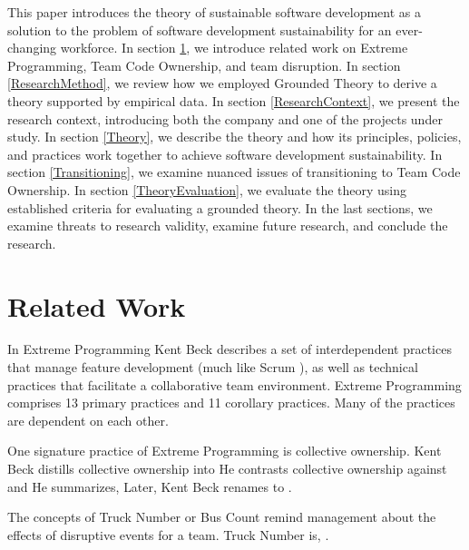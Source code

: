 This paper introduces the theory of sustainable software development as a solution to the problem of software development sustainability for an ever-changing workforce. In section \ref{RelatedWork}, we introduce related work on Extreme Programming, Team Code Ownership, and team disruption. In section \ref{ResearchMethod}, we review how we employed Grounded Theory to derive a theory supported by empirical data. In section \ref{ResearchContext}, we present the research context, introducing both the company and one of the projects under study. In section \ref{Theory}, we describe the theory and how its principles, policies, and practices work together to achieve software development sustainability. In section \ref{Transitioning}, we examine nuanced issues of transitioning to Team Code Ownership. In section \ref{TheoryEvaluation}, we evaluate the theory using established criteria for evaluating a grounded theory. In the last sections, we examine threats to research validity, examine future research, and conclude the research.
\section{Related Work}
\label{RelatedWork}
In Extreme Programming \cite{BeckExtremeProgramming2004} Kent Beck describes a set of interdependent practices that manage feature development (much like Scrum \cite{Scrum}), as well as technical practices that facilitate a collaborative team environment.  Extreme Programming comprises 13 primary practices and 11 corollary practices. Many of the practices are dependent on each other.  

One signature practice of Extreme Programming is collective ownership. Kent Beck distills collective ownership into  He contrasts collective ownership against  and  He summarizes,   \cite{BeckExtremeProgramming2000} Later, Kent Beck renames  to  \cite{BeckExtremeProgramming2004}. 

The concepts of Truck Number or Bus Count remind management about the effects of disruptive events for a team. Truck Number is,  \cite{WikiTruckNumber}. 

